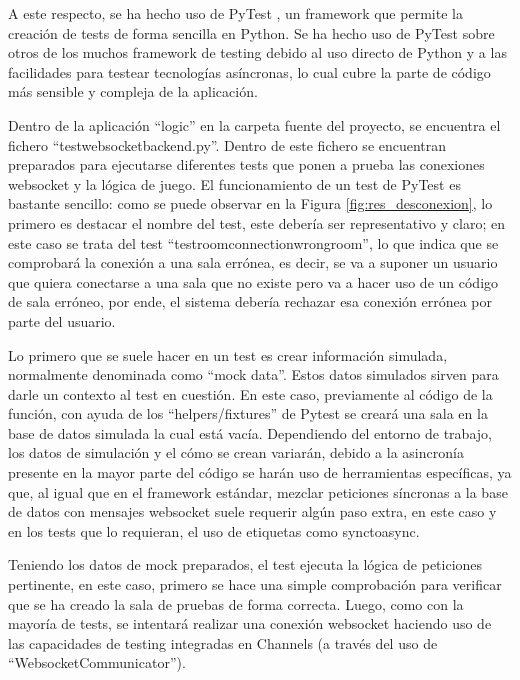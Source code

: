 A este respecto, se ha hecho uso de PyTest \cite{pytest}, un framework que permite la creación de tests de forma sencilla en Python. Se ha hecho uso
de PyTest sobre otros de los muchos framework de testing debido al uso directo de Python y a las facilidades para testear 
tecnologías asíncronas, lo cual cubre la parte de código más sensible y compleja de la aplicación.

Dentro de la aplicación ``logic'' en la carpeta fuente del proyecto, se encuentra el fichero ``test\textunderscore websocket\textunderscore backend.py''. Dentro de este fichero
se encuentran preparados para ejecutarse diferentes tests que ponen a prueba las conexiones websocket y la lógica de juego. El funcionamiento de un test 
de PyTest es bastante sencillo: como se puede observar en la Figura \ref{fig:res_desconexion}, lo primero es destacar el nombre del test, este debería ser representativo y 
claro; en este caso se trata del test ``test\textunderscore room\textunderscore connection\textunderscore wrong\textunderscore room'', lo que indica que 
se comprobará la conexión a una sala errónea, es decir, se va a suponer un usuario que quiera conectarse a una sala que no existe pero va a hacer uso
de un código de sala erróneo, por ende, el sistema debería rechazar esa conexión errónea por parte del usuario.

Lo primero que se suele hacer en un test es crear información simulada, normalmente denominada como ``mock data''. Estos datos simulados
sirven para darle un contexto al test en cuestión. En este caso, previamente al código de la función, con ayuda de los ``helpers/fixtures'' de Pytest 
se creará una sala en la base de datos simulada la cual está vacía. Dependiendo del entorno de trabajo, los datos de simulación y el cómo
se crean variarán, debido a la asincronía presente en la mayor parte del código se harán uso de herramientas específicas, ya que, al igual que 
en el framework estándar, mezclar peticiones síncronas a la base de datos con mensajes websocket suele requerir algún paso extra, en este caso y en los 
tests que lo requieran, el uso de etiquetas como sync\textunderscore to\textunderscore async.

Teniendo los datos de mock preparados, el test ejecuta la lógica de peticiones pertinente, en este caso, primero se hace
una simple comprobación para verificar que se ha creado la sala de pruebas de forma correcta. Luego, como con la mayoría de tests,
se intentará realizar una conexión websocket haciendo uso de las capacidades de testing integradas en Channels (a través del uso de ``WebsocketCommunicator'').

